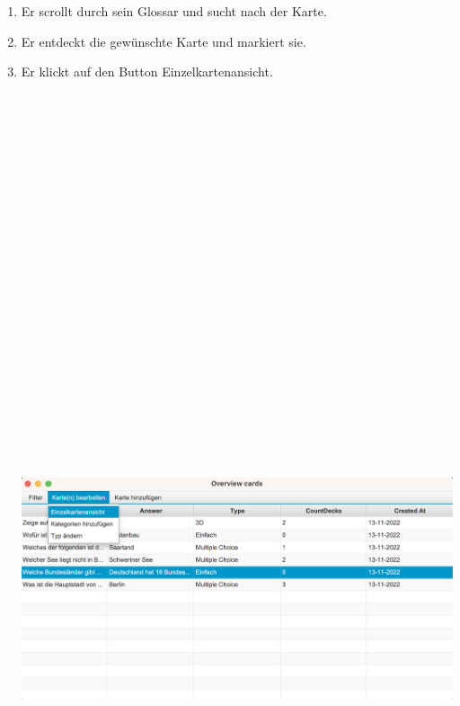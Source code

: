\begin{enumerate}
    \item Er scrollt durch sein Glossar und sucht nach der Karte.
    \item Er entdeckt die gewünschte Karte und markiert sie.
    \item Er klickt auf den Button \dq Einzelkartenansicht\dq.
    \begin{center}\includegraphics[width=17cm,height=35cm,keepaspectratio]{images/overview-details2.png}\end{center} 
    

\end{enumerate}
